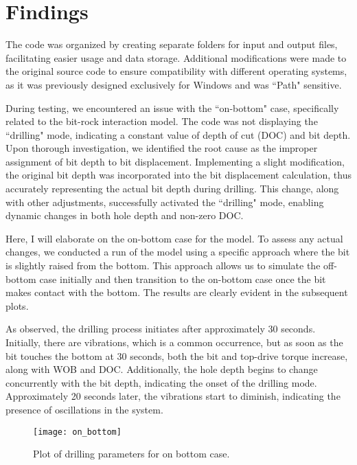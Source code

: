 \section{Findings}
 
The code was organized by creating separate folders for input and output files, facilitating easier usage and data storage. Additional modifications were made to the original source code to ensure compatibility with different operating systems, as it was previously designed exclusively for Windows and was ``Path" sensitive.

During testing, we encountered an issue with the ``on-bottom" case, specifically related to the bit-rock interaction model. The code was not displaying the ``drilling" mode, indicating a constant value of depth of cut (DOC) and bit depth. Upon thorough investigation, we identified the root cause as the improper assignment of bit depth to bit displacement. Implementing a slight modification, the original bit depth was incorporated into the bit displacement calculation, thus accurately representing the actual bit depth during drilling. This change, along with other adjustments, successfully activated the ``drilling" mode, enabling dynamic changes in both hole depth and non-zero DOC.

Here, I will elaborate on the on-bottom case for the model. To assess any actual changes, we conducted a run of the model using a specific approach where the bit is slightly raised from the bottom. This approach allows us to simulate the off-bottom case initially and then transition to the on-bottom case once the bit makes contact with the bottom. The results are clearly evident in the subsequent plots.

As observed, the drilling process initiates after approximately 30 seconds. Initially, there are vibrations, which is a common occurrence, but as soon as the bit touches the bottom at 30 seconds, both the bit and top-drive torque increase, along with WOB and DOC. Additionally, the hole depth begins to change concurrently with the bit depth, indicating the onset of the drilling mode. Approximately 20 seconds later, the vibrations start to diminish, indicating the presence of oscillations in the system. 

\begin{figure}
  \centering
  \texttt{[image: on\_bottom]}
  \caption[Plots of on bottom case.]{Plot of drilling parameters for on bottom case.}\label{findings}
\end{figure}
